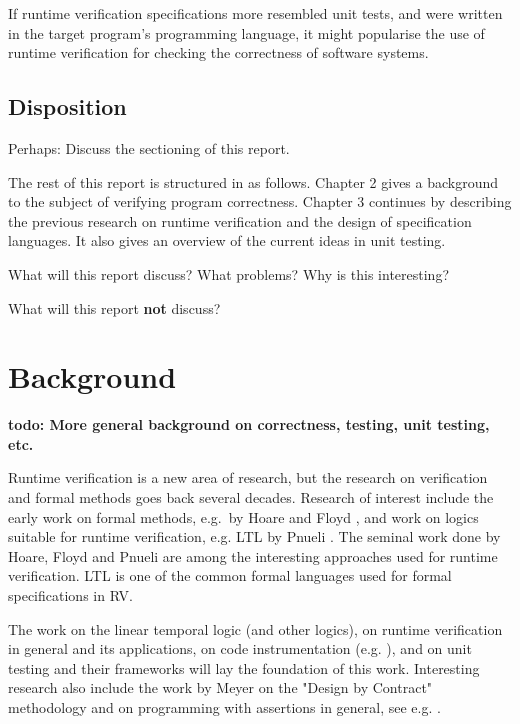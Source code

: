 \documentclass[a4paper,11pt]{kth-mag}
\newcommand{\todo}[1]{\textbf{todo: #1}}
\begin{document}
If runtime verification specifications more resembled unit tests, and were
written in the target program's programming language, it might popularise the
use of runtime verification for checking the correctness of software systems.

\section{Disposition}

Perhaps: Discuss the sectioning of this report.

The rest of this report is structured in as follows. Chapter 2 gives a
background to the subject of verifying program correctness. Chapter 3 continues
by describing the previous research on runtime verification and the design of
specification languages. It also gives an overview of the current ideas in unit
testing.

What will this report discuss? What problems? Why is this interesting?

What will this report \textbf{not} discuss?



\pagestyle{newchap}
\chapter{Background} \label{chapter-background}

\todo{More general background on correctness, testing, unit testing, etc.}


Runtime verification is a new area of research, but the research on
verification and formal methods goes back several decades. Research of interest
include the early work on formal methods, e.g.\ by Hoare \cite{hoare69} and
Floyd \cite{floyd67}, and work on logics suitable for runtime verification,
e.g. LTL by Pnueli \cite{pnueli77}. The seminal work done by Hoare, Floyd and
Pnueli are among the interesting approaches used for runtime verification. LTL
is one of the common formal languages used for formal specifications in RV.

The work on the linear temporal logic (and other logics), on runtime
verification in general and its applications, on code instrumentation (e.g.
\cite{aspectj,matusiak09aoppy}), and on unit testing and their frameworks will
lay the foundation of this work. Interesting research also include the work by
Meyer on the "Design by Contract" methodology \cite{meyer92applyingdbc} and on
programming with assertions in general, see e.g.
\cite{rosenblum95practicalassertions,bartetzko01jass}.
\end{document}
